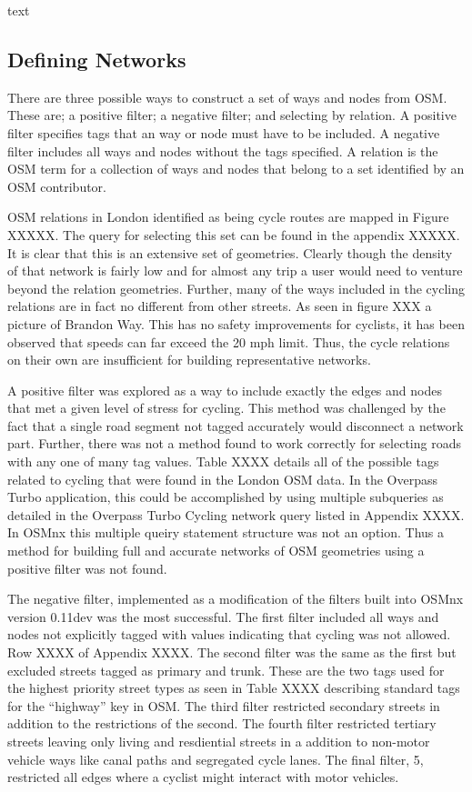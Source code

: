 text


\subsection{Defining Networks}

There are three possible ways to construct a set of ways and nodes from OSM. These are; a positive filter; a negative filter; and selecting by relation. A positive filter specifies tags that an way or node must have to be included. A negative filter includes all ways and nodes without the tags specified. A relation is the OSM term for a collection of ways and nodes that belong to a set identified by an OSM contributor. 

OSM relations in London identified as being cycle routes are mapped in Figure XXXXX. The query for selecting this set can be found in the appendix XXXXX. It is clear that this is an extensive set of geometries. Clearly though the density of that network is fairly low and for almost any trip a user would need to venture beyond the relation geometries. Further, many of the ways included in the cycling relations are in fact no different from other streets. As seen in figure XXX a picture of Brandon Way. This has no safety improvements for cyclists, it has been observed that speeds can far exceed the 20 mph limit. Thus, the cycle relations on their own are insufficient for building representative networks. 

A positive filter was explored as a way to include exactly the edges and nodes that met a given level of stress for cycling. This method was challenged by the fact that a single road segment not tagged accurately would disconnect a network part. Further, there was not a method found to work correctly for selecting roads with any one of many tag values.  Table XXXX details all of the possible tags related to cycling that were found in the London OSM data.  In the Overpass Turbo application, this could be accomplished by using multiple subqueries as detailed in the Overpass Turbo Cycling network query listed in Appendix XXXX. In OSMnx this multiple queiry statement structure was not an option. Thus a method for building full and accurate networks of OSM geometries using a positive filter was not found. 

The negative filter, implemented as a modification of the filters built into OSMnx version 0.11dev was the most successful. The first filter included all ways and nodes not explicitly tagged with values indicating that cycling was not allowed. Row XXXX of Appendix XXXX. The second filter was the same as the first but excluded streets tagged as primary and trunk. These are the two tags used for the highest priority street types as seen in Table XXXX describing standard tags for the ``highway'' key in OSM. The third filter restricted secondary streets in addition to the restrictions of the second. The fourth filter restricted tertiary streets leaving only living and resdiential streets in a addition to non-motor vehicle ways like canal paths and segregated cycle lanes. The final filter, 5, restricted all edges where a cyclist might interact with motor vehicles. 

